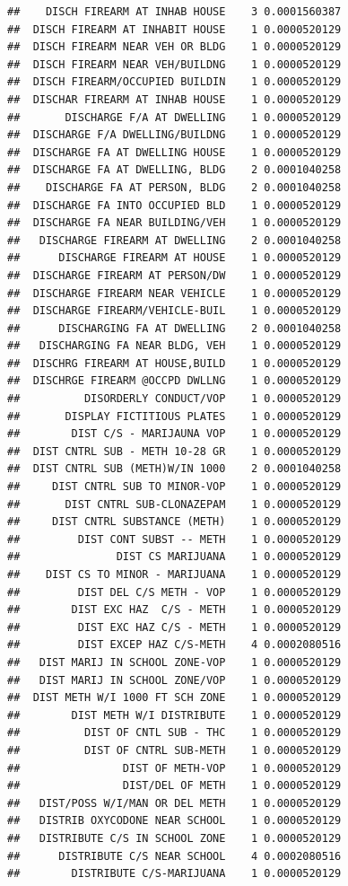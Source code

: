 \documentclass[]{book}
\begin{document}
\begin{verbatim}
##    DISCH FIREARM AT INHAB HOUSE    3 0.0001560387
##  DISCH FIREARM AT INHABIT HOUSE    1 0.0000520129
##  DISCH FIREARM NEAR VEH OR BLDG    1 0.0000520129
##  DISCH FIREARM NEAR VEH/BUILDNG    1 0.0000520129
##  DISCH FIREARM/OCCUPIED BUILDIN    1 0.0000520129
##  DISCHAR FIREARM AT INHAB HOUSE    1 0.0000520129
##       DISCHARGE F/A AT DWELLING    1 0.0000520129
##  DISCHARGE F/A DWELLING/BUILDNG    1 0.0000520129
##  DISCHARGE FA AT DWELLING HOUSE    1 0.0000520129
##  DISCHARGE FA AT DWELLING, BLDG    2 0.0001040258
##    DISCHARGE FA AT PERSON, BLDG    2 0.0001040258
##  DISCHARGE FA INTO OCCUPIED BLD    1 0.0000520129
##  DISCHARGE FA NEAR BUILDING/VEH    1 0.0000520129
##   DISCHARGE FIREARM AT DWELLING    2 0.0001040258
##      DISCHARGE FIREARM AT HOUSE    1 0.0000520129
##  DISCHARGE FIREARM AT PERSON/DW    1 0.0000520129
##  DISCHARGE FIREARM NEAR VEHICLE    1 0.0000520129
##  DISCHARGE FIREARM/VEHICLE-BUIL    1 0.0000520129
##      DISCHARGING FA AT DWELLING    2 0.0001040258
##   DISCHARGING FA NEAR BLDG, VEH    1 0.0000520129
##  DISCHRG FIREARM AT HOUSE,BUILD    1 0.0000520129
##  DISCHRGE FIREARM @OCCPD DWLLNG    1 0.0000520129
##          DISORDERLY CONDUCT/VOP    1 0.0000520129
##       DISPLAY FICTITIOUS PLATES    1 0.0000520129
##        DIST C/S - MARIJAUNA VOP    1 0.0000520129
##  DIST CNTRL SUB - METH 10-28 GR    1 0.0000520129
##  DIST CNTRL SUB (METH)W/IN 1000    2 0.0001040258
##     DIST CNTRL SUB TO MINOR-VOP    1 0.0000520129
##       DIST CNTRL SUB-CLONAZEPAM    1 0.0000520129
##     DIST CNTRL SUBSTANCE (METH)    1 0.0000520129
##         DIST CONT SUBST -- METH    1 0.0000520129
##               DIST CS MARIJUANA    1 0.0000520129
##    DIST CS TO MINOR - MARIJUANA    1 0.0000520129
##         DIST DEL C/S METH - VOP    1 0.0000520129
##        DIST EXC HAZ  C/S - METH    1 0.0000520129
##         DIST EXC HAZ C/S - METH    1 0.0000520129
##         DIST EXCEP HAZ C/S-METH    4 0.0002080516
##   DIST MARIJ IN SCHOOL ZONE-VOP    1 0.0000520129
##   DIST MARIJ IN SCHOOL ZONE/VOP    1 0.0000520129
##  DIST METH W/I 1000 FT SCH ZONE    1 0.0000520129
##        DIST METH W/I DISTRIBUTE    1 0.0000520129
##          DIST OF CNTL SUB - THC    1 0.0000520129
##          DIST OF CNTRL SUB-METH    1 0.0000520129
##                DIST OF METH-VOP    1 0.0000520129
##                DIST/DEL OF METH    1 0.0000520129
##   DIST/POSS W/I/MAN OR DEL METH    1 0.0000520129
##   DISTRIB OXYCODONE NEAR SCHOOL    1 0.0000520129
##   DISTRIBUTE C/S IN SCHOOL ZONE    1 0.0000520129
##      DISTRIBUTE C/S NEAR SCHOOL    4 0.0002080516
##        DISTRIBUTE C/S-MARIJUANA    1 0.0000520129

\end{verbatim}
\end{document}
